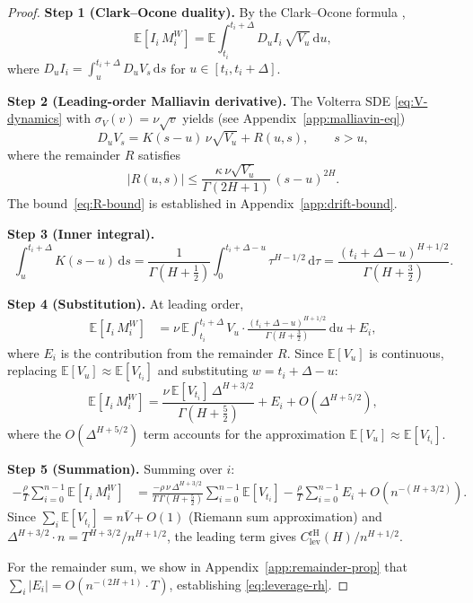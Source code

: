\documentclass[12pt]{article}
\theoremstyle{definition}
\newcommand{\E}{\mathbb{E}}
\newcommand{\dd}{\mathrm{d}}
\begin{document}
\begin{proof}
\textbf{Step 1 (Clark--Ocone duality).}
By the Clark--Ocone formula \citep{Nualart2006},
\begin{equation}\label{eq:clark-ocone}
  \E[I_i\, M_i^W]
  = \E\!\int_{t_i}^{t_i+\Delta}\!
    D_u I_i\,\sqrt{V_u}\,\dd u,
\end{equation}
where $D_u I_i = \int_u^{t_i+\Delta} D_u V_s\,\dd s$
for $u \in [t_i, t_i{+}\Delta]$.

\textbf{Step 2 (Leading-order Malliavin derivative).}
The Volterra SDE \eqref{eq:V-dynamics} with
$\sigma_V(v) = \nu\sqrt{v}$ yields (see Appendix~\ref{app:malliavin-eq})
\begin{equation}\label{eq:DuVs-leading}
  D_u V_s = K(s{-}u)\,\nu\sqrt{V_u}
  + R(u,s),
  \qquad s > u,
\end{equation}
where the remainder $R$ satisfies
\begin{equation}\label{eq:R-bound}
  |R(u,s)| \le \frac{\kappa\,\nu\sqrt{V_u}}
  {\Gamma(2H{+}1)}\,(s{-}u)^{2H}.
\end{equation}
The bound~\eqref{eq:R-bound} is established in
Appendix~\ref{app:drift-bound}.

\textbf{Step 3 (Inner integral).}
\begin{equation}\label{eq:inner-integral}
  \int_u^{t_i+\Delta}\! K(s{-}u)\,\dd s
  = \frac{1}{\Gamma(H{+}\tfrac12)}
    \int_0^{t_i+\Delta-u}\!\! \tau^{H-1/2}\,\dd\tau
  = \frac{(t_i{+}\Delta{-}u)^{H+1/2}}
         {\Gamma(H{+}\tfrac32)}.
\end{equation}

\textbf{Step 4 (Substitution).}
At leading order,
\begin{align*}
  \E[I_i\,M_i^W]
  &= \nu\,\E\!\int_{t_i}^{t_i+\Delta}\!
    V_u \cdot
    \frac{(t_i{+}\Delta{-}u)^{H+1/2}}{\Gamma(H{+}\tfrac32)}
    \,\dd u
    + E_i,
\end{align*}
where $E_i$ is the contribution from the remainder $R$.
Since $\E[V_u]$ is continuous, replacing
$\E[V_u] \approx \E[V_{t_i}]$ and substituting
$w = t_i{+}\Delta{-}u$:
\begin{equation}\label{eq:per-interval}
  \E[I_i\,M_i^W]
  = \frac{\nu\,\E[V_{t_i}]\,\Delta^{H+3/2}}
         {\Gamma(H{+}\tfrac52)}
  + E_i + O(\Delta^{H+5/2}),
\end{equation}
where the $O(\Delta^{H+5/2})$ term accounts for the approximation
$\E[V_u] \approx \E[V_{t_i}]$.

\textbf{Step 5 (Summation).}
Summing over $i$:
\begin{align}
  -\frac{\rho}{T}\sum_{i=0}^{n-1}\E[I_i\,M_i^W]
  &= \frac{-\rho\,\nu\,\Delta^{H+3/2}}
         {T\,\Gamma(H{+}\tfrac52)}
  \sum_{i=0}^{n-1}\E[V_{t_i}]
  -\frac{\rho}{T}\sum_{i=0}^{n-1} E_i
  + O(n^{-(H+3/2)}).
  \label{eq:sum-leverage}
\end{align}
Since $\sum_i \E[V_{t_i}] = n\bar V + O(1)$ (Riemann sum approximation)
and $\Delta^{H+3/2}\cdot n = T^{H+3/2}/n^{H+1/2}$,
the leading term gives $C_{\mathrm{lev}}^{\mathrm{rH}}(H)/n^{H+1/2}$.

For the remainder sum, we show in Appendix~\ref{app:remainder-prop}
that $\sum_i |E_i| = O(n^{-(2H+1)} \cdot T)$, establishing
\eqref{eq:leverage-rh}.
\end{proof}
\end{document}
